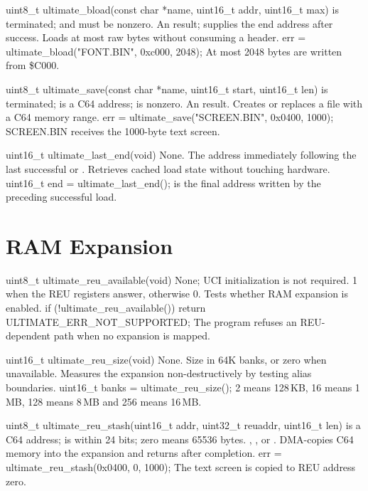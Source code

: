 \begin{referencechapter}
{uint8\_t ultimate\_bload(const char *name, uint16\_t addr, uint16\_t max)}
{ is terminated;  and  must be nonzero.}
{An  result;  supplies the end
address after success.}
{Loads at most  raw bytes without consuming a header.}
{err = ultimate\_bload("FONT.BIN", 0xc000, 2048);}
{At most 2048 bytes are written from \$C000.}

{uint8\_t ultimate\_save(const char *name, uint16\_t start, uint16\_t len)}
{ is terminated;  is a C64 address;  is nonzero.}
{An  result.}
{Creates or replaces a file with a C64 memory range.}
{err = ultimate\_save("SCREEN.BIN", 0x0400, 1000);}
{SCREEN.BIN receives the 1000-byte text screen.}

{uint16\_t ultimate\_last\_end(void)}
{None.}
{The address immediately following the last successful
 or .}
{Retrieves cached load state without touching hardware.}
{uint16\_t end = ultimate\_last\_end();}
{ is the final address written by the preceding successful load.}

\section{RAM Expansion}

{uint8\_t ultimate\_reu\_available(void)}
{None; UCI initialization is not required.}
{1 when the REU registers answer, otherwise 0.}
{Tests whether RAM expansion is enabled.}
{if (!ultimate\_reu\_available()) return ULTIMATE\_ERR\_NOT\_SUPPORTED;}
{The program refuses an REU-dependent path when no expansion is mapped.}

{uint16\_t ultimate\_reu\_size(void)}
{None.}
{Size in 64K banks, or zero when unavailable.}
{Measures the expansion non-destructively by testing alias boundaries.}
{uint16\_t banks = ultimate\_reu\_size();}
{2 means 128\,KB, 16 means 1\,MB, 128 means 8\,MB and 256 means 16\,MB.}

{uint8\_t ultimate\_reu\_stash(uint16\_t addr, uint32\_t reuaddr, uint16\_t len)}
{ is a C64 address;  is within 24 bits; zero
 means 65536 bytes.}
{, , or
.}
{DMA-copies C64 memory into the expansion and returns after completion.}
{err = ultimate\_reu\_stash(0x0400, 0, 1000);}
{The text screen is copied to REU address zero.}


\end{referencechapter}
